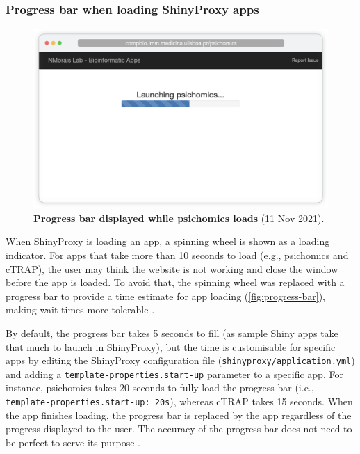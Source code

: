 \subsubsection{Progress bar when loading ShinyProxy apps}

\begin{figure}
  \vspace{-\intextsep}
  \includegraphics[width=\linewidth]{images/app-server/progress-bar}
  \caption[Screenshot of app loading]{\textbf{Progress bar displayed while psichomics loads} (11 Nov 2021).}
  \label{fig:progress-bar}
  \vspace{-\intextsep}
\end{figure}


When ShinyProxy is loading an app, a spinning wheel is shown as a loading indicator. For apps that take more than 10 seconds to load (e.g., psichomics and cTRAP), the user may think the website is not working and close the window before the app is loaded. To avoid that, the spinning wheel was replaced with a progress bar to provide a time estimate for app loading (\autoref{fig:progress-bar}), making wait times more tolerable \cite{myers:1985aa,yablonski:2020ts}.

\bigskip
\bigskip

By default, the progress bar takes 5 seconds to fill (as sample Shiny apps take that much to launch in ShinyProxy), but the time is customisable for specific apps by editing the ShinyProxy configuration file (\texttt{shinyproxy/application.yml}) and adding a \texttt{template-properties.start-up} parameter to a specific app. For instance, psichomics takes 20 seconds to fully load the progress bar (i.e., \texttt{template-properties.start-up: 20s}), whereas cTRAP takes 15 seconds. When the app finishes loading, the progress bar is replaced by the app regardless of the progress displayed to the user. The accuracy of the progress bar does not need to be perfect to serve its purpose \cite{myers:1985aa,yablonski:2020ts}.

